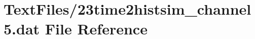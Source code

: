 \hypertarget{23time2histsim__channel5_8dat}{}\section{Text\+Files/23time2histsim\+\_\+channel5.dat File Reference}
\label{23time2histsim__channel5_8dat}
